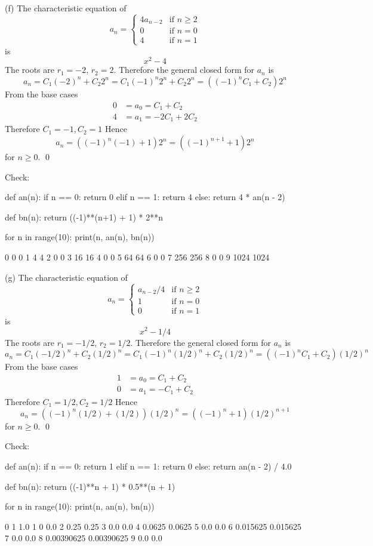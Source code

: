 (f)
The characteristic equation of
\[
a_n = 
\begin{cases}
  4 a_{n-2} &\text{if } n \geq 2 \\
  0        &\text{if } n = 0 \\
  4        &\text{if } n = 1
\end{cases}
\]
is
\[
x^2 - 4
\]
The roots are $r_1 = -2$, $r_2 = 2$.
Therefore the general closed form for $a_n$ is
\[
a_n = C_1 (-2)^n + C_2 2^n
= C_1 (-1)^n 2^n + C_2 2^n
= ((-1)^n C_1 + C_2) 2^n
\]
From the base cases
\begin{align*}
0 &= a_0 = C_1 + C_2 \\
4 &= a_1 = -2C_1 + 2C_2 
\end{align*}
Therefore $C_1 = -1, C_2 = 1$
Hence
\[
a_n = ((-1)^n (-1) + 1) 2^n = ((-1)^{n+1} + 1) 2^n
\]
for $n \geq 0$.
\qed

Check:
\begin{console}[fontsize=\footnotesize]
def an(n):
    if n == 0: return 0
    elif n == 1: return 4
    else: return  4 * an(n - 2)

def bn(n):
    return ((-1)**(n+1) + 1) * 2**n

for n in range(10):
    print(n, an(n), bn(n))
\end{console}
\begin{console}[fontsize=\footnotesize]
0 0 0
1 4 4
2 0 0
3 16 16
4 0 0
5 64 64
6 0 0
7 256 256
8 0 0
9 1024 1024
\end{console}


(g)
The characteristic equation of
\[
a_n = 
\begin{cases}
  a_{n-2}/4 &\text{if } n \geq 2 \\
  1        &\text{if } n = 0 \\
  0        &\text{if } n = 1
\end{cases}
\]
is
\[
x^2 - 1/4
\]
The roots are $r_1 = -1/2$, $r_2 = 1/2$.
Therefore the general closed form for $a_n$ is
\[
a_n = C_1 (-1/2)^n + C_2 (1/2)^n
= C_1 (-1)^n (1/2)^n + C_2 (1/2)^n
= ((-1)^n C_1 + C_2) (1/2)^n
\]
From the base cases
\begin{align*}
1 &= a_0 = C_1 + C_2 \\
0 &= a_1 = -C_1 + C_2 
\end{align*}
Therefore $C_1 = 1/2, C_2 = 1/2$
Hence
\[
a_n = ((-1)^n (1/2) + (1/2)) (1/2)^n = ((-1)^{n} + 1) (1/2)^{n + 1}
\]
for $n \geq 0$.
\qed

Check:
\begin{console}[fontsize=\footnotesize]
def an(n):
    if n == 0: return 1
    elif n == 1: return 0
    else: return  an(n - 2) / 4.0

def bn(n):
    return ((-1)**n + 1) * 0.5**(n + 1)

for n in range(10):
    print(n, an(n), bn(n))
\end{console}
\begin{console}[fontsize=\footnotesize]
0 1 1.0
1 0 0.0
2 0.25 0.25
3 0.0 0.0
4 0.0625 0.0625
5 0.0 0.0
6 0.015625 0.015625
7 0.0 0.0
8 0.00390625 0.00390625
9 0.0 0.0
\end{console}



